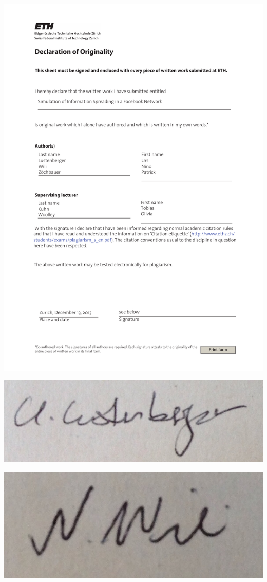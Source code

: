 \documentclass[11pt]{article}
\begin{document}
\includegraphics[scale=0.6]{originality.pdf}
\newline
\begin{minipage}{0.33\textwidth}
\includegraphics[scale=0.13]{urs.png}
\end{minipage}
\begin{minipage}{0.33\textwidth}
\includegraphics[scale=0.13]{nino.png}
\end{minipage}
\end{document}
